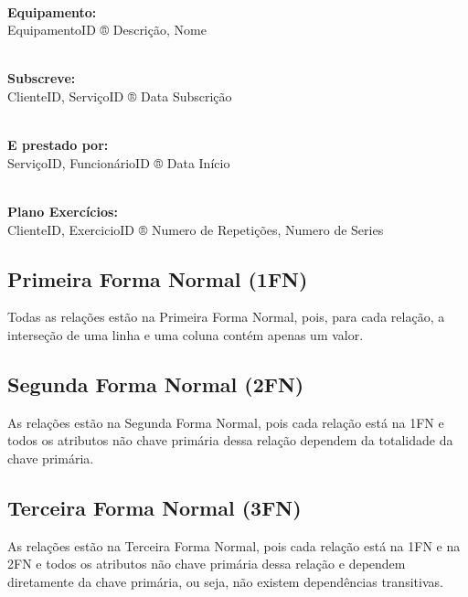 \noindent
\\\textbf{Equipamento:}
\\EquipamentoID ® Descrição, Nome

\noindent
\\\textbf{Subscreve:}
\\ClienteID, ServiçoID ® Data Subscrição

\noindent
\\\textbf{E prestado por:}
\\ServiçoID, FuncionárioID ® Data Início

\noindent
\\\textbf{Plano Exercícios:}
\\ClienteID, ExercicioID ® Numero de Repetições, Numero de Series



\subsection{Primeira Forma Normal (1FN)}

Todas as relações estão na Primeira Forma Normal, pois, para cada relação, a interseção de uma linha e uma coluna contém apenas um valor.

\subsection{Segunda Forma Normal (2FN)}

As relações estão na Segunda Forma Normal, pois cada relação está na 1FN e todos os atributos não chave primária dessa relação dependem da totalidade da chave primária.

\subsection{Terceira Forma Normal (3FN)}

As relações estão na Terceira Forma Normal, pois cada relação está na 1FN e na 2FN e todos os atributos não chave primária dessa relação e dependem diretamente da chave primária, ou seja, não existem dependências transitivas.